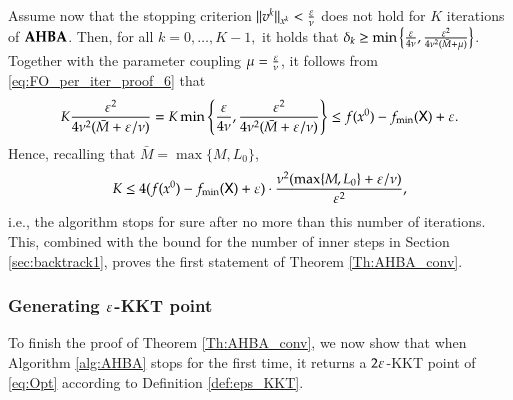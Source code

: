 Assume now that the stopping criterion $\lVert v^k\rVert_{x^k} < \frac{\varepsilon}{ \nu}$ does not hold for $K$ iterations of $\operatorname{\mathbf{AHBA}}$. Then, for all $k=0,\ldots,K-1,$ it holds that 
$\delta_{k}\geq \min\left\{\frac{\varepsilon}{4 \nu},\frac{\varepsilon^{2}}{4 \nu^{2}(\bar{M}+\mu)}\right\}$. 
Together with the parameter coupling $\mu=\frac{\varepsilon}{\nu}$, it follows from \eqref{eq:FO_per_iter_proof_6} that
\[
K\frac{\varepsilon^{2}}{4 \nu^{2}(\bar{M}+\varepsilon/\nu)} = K \min\left\{\frac{\varepsilon}{4 \nu},\frac{\varepsilon^{2}}{4 \nu^{2}(\bar{M}+\varepsilon/\nu)}\right\}\leq f(x^{0})-f_{\min}(\mathsf{X})+\varepsilon.
\]
Hence, recalling that $\bar{M}=\max\{M,L_0\}$,
\[
K \leq 4(f(x^{0}) - f_{\min}(\setX)+ \eps) \cdot \frac{\nu^{2}(\max\{M,L_0\}+\eps/\nu)}{\eps^{2}},%
\] 
i.e., the algorithm stops for sure after no more than this number of iterations. This, combined with the bound for the number of inner steps in Section \ref{sec:backtrack1}, proves the first statement of Theorem \ref{Th:AHBA_conv}.

\subsubsection{Generating $\varepsilon$-KKT point}
To finish the proof of Theorem \ref{Th:AHBA_conv}, we now show that when Algorithm \ref{alg:AHBA} stops for the first time, it returns a $2\varepsilon$-KKT point of \eqref{eq:Opt} according to Definition \ref{def:eps_KKT}.

